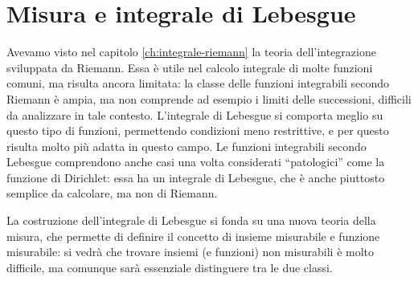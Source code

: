 \chapter{Misura e integrale di Lebesgue}
Avevamo visto nel capitolo \ref{ch:integrale-riemann} la teoria dell'integrazione sviluppata da Riemann.
Essa è utile nel calcolo integrale di molte funzioni comuni, ma risulta ancora limitata: la classe delle funzioni integrabili secondo Riemann è ampia, ma non comprende ad esempio i limiti delle successioni, difficili da analizzare in tale contesto.
L'integrale di Lebesgue si comporta meglio su questo tipo di funzioni, permettendo condizioni meno restrittive, e per questo risulta molto più adatta in questo campo.
Le funzioni integrabili secondo Lebesgue comprendono anche casi una volta considerati ``patologici'' come la funzione di Dirichlet: essa ha un integrale di Lebesgue, che è anche piuttosto semplice da calcolare, ma non di Riemann.

La costruzione dell'integrale di Lebesgue si fonda su una nuova teoria della misura, che permette di definire il concetto di insieme misurabile e funzione misurabile: si vedrà che trovare insiemi (e funzioni) non misurabili è molto difficile, ma comunque sarà essenziale distinguere tra le due classi.

